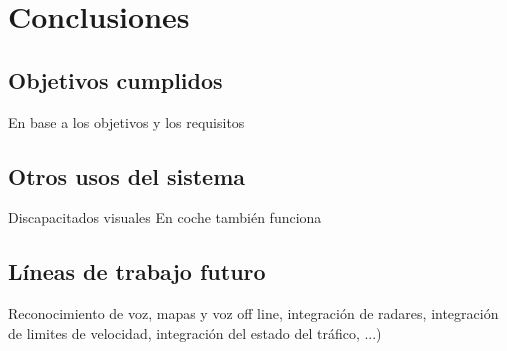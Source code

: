 \chapter{Conclusiones}
\label{chap:conclusiones}

\section{Objetivos cumplidos}

En base a los objetivos y los requisitos

\section{Otros usos del sistema}

Discapacitados visuales
En coche también funciona

\section{Líneas de trabajo futuro}

Reconocimiento de voz, mapas y voz off line, integración de radares, integración de limites de
velocidad, integración del estado del tráfico, ...)


